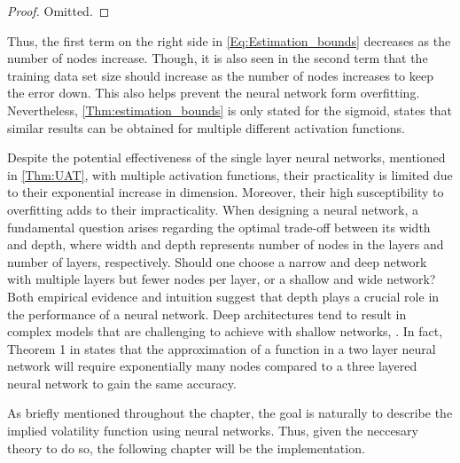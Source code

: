 \begin{proof}
Omitted.
\end{proof}

Thus, the first term on the right side in \eqref{Eq:Estimation_bounds} decreases as the number of nodes increase. Though, it is also seen in the second term that the training data set size should increase as the number of nodes increases to keep the error down. This also helps prevent the neural network form overfitting. Nevertheless, \autoref{Thm:estimation_bounds} is only stated for the sigmoid, \citep[s. 117]{Barron} states that similar results can be obtained for multiple different activation functions. 

Despite the potential effectiveness of the single layer neural networks, mentioned in \autoref{Thm:UAT}, with multiple activation functions, their practicality is limited due to their exponential increase in dimension. Moreover, their high susceptibility to overfitting adds to their impracticality. When designing a neural network, a fundamental question arises regarding the optimal trade-off between its width and depth, where width and depth represents number of nodes in the layers and number of layers, respectively. Should one choose a narrow and deep network with multiple layers but fewer nodes per layer, or a shallow and wide network? Both empirical evidence and intuition suggest that depth plays a crucial role in the performance of a neural network. Deep architectures tend to result in complex models that are challenging to achieve with shallow networks, \citep{REOS}. In fact, Theorem 1 in \citep{REOS} states that the approximation of a function in a two layer neural network will require exponentially many nodes compared to a three layered neural network to gain the same accuracy. %


As briefly mentioned throughout the chapter, the goal is naturally to describe the implied volatility function using neural networks. Thus, given the neccesary theory to do so, the following chapter will be the implementation. 